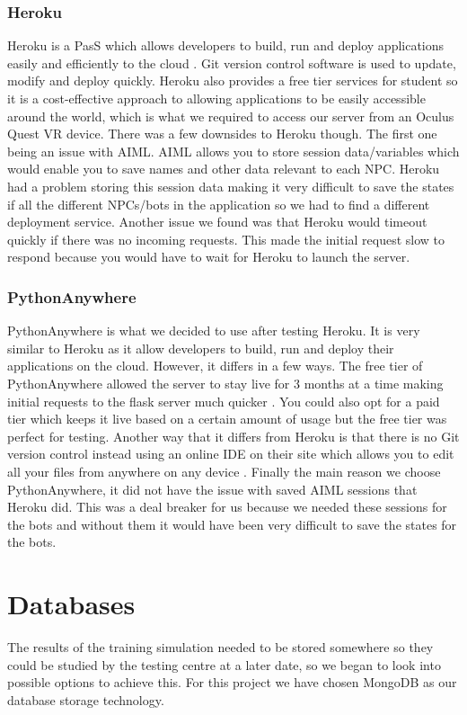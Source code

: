 \subsubsection{Heroku}
Heroku is a PasS which allows developers to build, run and deploy applications easily and efficiently to the cloud \cite{heroku}. Git version control software is used to update, modify and deploy quickly. Heroku also provides a free tier services for student so it is a cost-effective approach to allowing applications to be easily accessible around the world, which is what we required to access our server from an Oculus Quest VR device. There was a few downsides to Heroku though. The first one being an issue with AIML. AIML allows you to store session data/variables which would enable you to save names and other data relevant to each NPC. Heroku had a problem storing this session data making it very difficult to save the states if all the different NPCs/bots in the application so we had to find a different deployment service. Another issue we found was that Heroku would timeout quickly if there was no incoming requests. This made the initial request slow to respond because you would have to wait for Heroku to launch the server.

\subsubsection{PythonAnywhere}
PythonAnywhere is what we decided to use after testing Heroku. It is very similar to Heroku as it allow developers to build, run and deploy their applications on the cloud. However, it differs in a few ways. The free tier of PythonAnywhere allowed the server to stay live for 3 months at a time making initial requests to the flask server much quicker \cite{pythonanywhere}. You could also opt for a paid tier which keeps it live based on a certain amount of usage but the free tier was perfect for testing. Another way that it differs from Heroku is that there is no Git version control instead using an online IDE on their site which allows you to edit all your files from anywhere on any device \cite{pythonanywhere}. Finally the main reason we choose PythonAnywhere, it did not have the issue with saved AIML sessions that Heroku did. This was a deal breaker for us because we needed these sessions for the bots and without them it would have been very difficult to save the states for the bots. 

\section{Databases}
The results of the training simulation needed to be stored somewhere so they could be studied by the testing centre at a later date, so we began to look into possible options to achieve this. For this project we have chosen MongoDB as our database storage technology.

